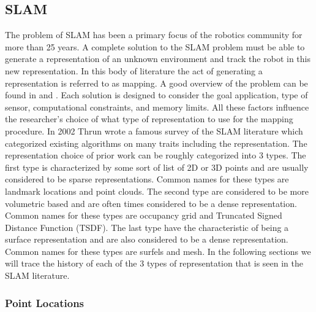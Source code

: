 \documentclass[12pt]{article}
\begin{document}
\subsection{SLAM}  

The problem of SLAM has been a primary focus of the robotics community for
more than 25 years. A complete solution to the SLAM problem must be able to
generate a representation of an unknown environment and track the robot in
this new representation. In this body of literature the act of generating a
representation is referred to as mapping. A good overview of the problem
can be found in \cite{Durrant-Whyte2006} and \cite{Bailey2006}. Each
solution is designed to consider the goal application, type of sensor,
computational constraints, and memory limits. All these factors influence
the researcher's choice of what type of representation to use for the
mapping procedure. In 2002 Thrun wrote a famous survey \cite{Thrun2002} of
the SLAM literature which categorized existing algorithms on many traits
including the representation. The representation choice of prior work can
be roughly categorized into 3 types. The first type is characterized by
some sort of list of 2D or 3D points and are usually considered to be
sparse representations. Common names for these types are landmark locations
and point clouds. The second type are considered to be more volumetric
based and are often times considered to be a dense representation. Common
names for these types are occupancy grid and Truncated Signed Distance
Function (TSDF). The last type have the characteristic of being a surface
representation and are also considered to be a dense representation. Common
names for these types are surfels and mesh. In the following sections we
will trace the history of each of the 3 types of representation that is
seen in the SLAM literature. 

\subsubsection{Point Locations}   
\end{document}
